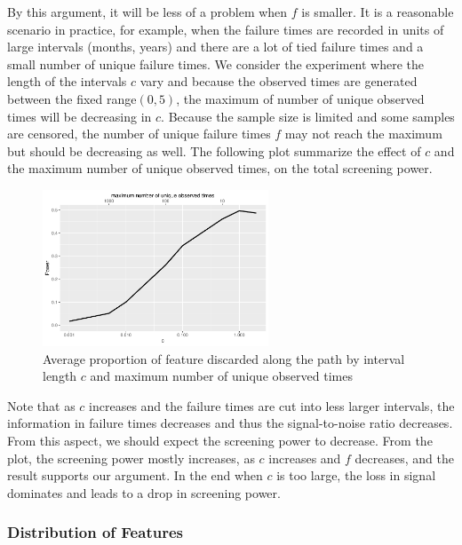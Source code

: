 By this argument, it will be less of a problem when $f$ is smaller. It is a reasonable scenario in practice, for example, when the failure times are recorded in units of large intervals (months, years) and there are a lot of tied failure times and a small number of unique failure times. We consider the experiment where the length of the intervals $c$ vary and because the observed times are generated between the fixed range$(0,5)$, the maximum of number of unique observed times will be decreasing in $c$. Because the sample size is limited and some samples are censored, the number of unique failure times $f$ may not reach the maximum but should be decreasing as well. The following plot summarize the effect of $c$ and the maximum number of unique observed times, on the total screening power.

\begin{figure}[ht]
    \centering
    \includegraphics[width=0.6\textwidth]{interval.pdf}
    \caption{Average proportion of feature discarded along the path by interval length $c$ and maximum number of unique observed times}
\end{figure}

Note that as $c$ increases and the failure times are cut into less larger intervals, the information in failure times decreases and thus the signal-to-noise ratio decreases. From this aspect, we should expect the screening power to decrease. From the plot, the screening power mostly increases, as $c$ increases and $f$ decreases, and the result supports our argument. In the end when $c$ is too large, the loss in signal dominates and leads to a drop in screening power.

\subsubsection{Distribution of Features}


